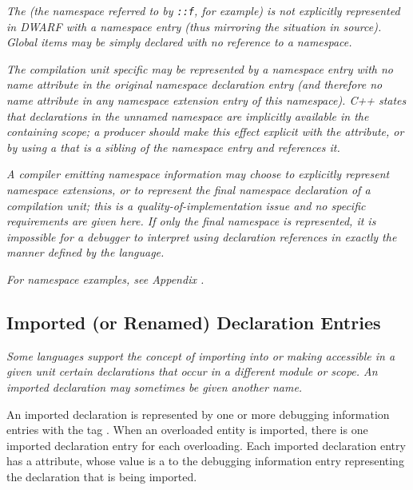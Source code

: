 \textit{The  
(the
namespace
referred to by
\texttt{::f}, for example) is not explicitly represented in
DWARF with a namespace entry (thus mirroring the situation
in  source).
Global items may be simply declared with no
reference to a namespace.}

\textit{The 
compilation unit specific  may
be represented by a namespace entry with no name attribute in
the original namespace declaration entry (and therefore no name
attribute in any namespace extension entry of this namespace).
C++ states that declarations in the unnamed namespace are
implicitly available in the containing scope; a producer
should make this effect explicit with the \DWATexportsymbols{}
attribute, or by using a \DWTAGimportedmodule{} that is a
sibling of the namespace entry and references it.}

\textit{A compiler emitting namespace information may choose to
explicitly represent namespace extensions, or to represent the
final namespace declaration of a compilation unit; this is a
quality-of-implementation issue and no specific requirements
are given here. If only the final namespace is represented,
it is impossible for a debugger to interpret using declaration
references in exactly the manner defined by the
 language.}

\textit{For  namespace examples,
see Appendix .}


\subsection{Imported (or Renamed) Declaration Entries}
\label{chap:importedorrenameddeclarationentries}

\textit{Some languages support the concept of importing into or
making accessible in a given unit certain declarations that occur
in a different module or scope. An imported declaration may
sometimes be given another name.}

An imported declaration is represented by one or
more debugging information entries with the
tag \DWTAGimporteddeclarationTARG.
When\hypertarget{chap:DWATimportimporteddeclaration}{}
an overloaded entity is imported, there is one imported
declaration entry for each overloading.
Each imported declaration entry has a
\DWATimportDEFN{} attribute,
whose value is a  to the
debugging information entry representing the declaration that
is being imported.

